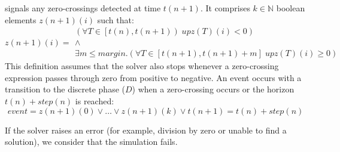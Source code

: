 \documentclass[11pt,titlepage,twoside]{report}
\newcommand{\bN}{\mathbb{N}}
\begin{document}
\begin{description}[leftmargin=3.5em,style=multiline]
    \item[$z(n+1)$] signals any zero-crossings detected at time $t(n+1)$.
      It comprises $k \in \bN$ boolean elements $z(n+1)(i)$ such that:
      \[
      z(n+1)(i) = %
        \begin{array}{l}
           (\forall T \in \left[t(n), t(n+1)\right) \; upz(T)(i) < 0) \\
           \wedge \\
           \exists m \leq \mathit{margin}.
              (\forall T \in [t(n+1), t(n+1)+m] \; upz(T)(i) \geq 0)
        \end{array}
      \]
This definition assumes that the solver also stops whenever a zero-crossing 
expression passes through zero from positive to negative.
An event occurs with a transition to the discrete phase ($D$) when a zero-crossing
occurs or the horizon $t(n)+step(n)$ is reached:
  \[\mathit{event} = z(n+1)(0) \vee \dots \vee z(n+1)(k) \vee
                             t(n+1) = t(n) + step(n)
  \]
\end{description}
If the solver raises an error (for example, division by zero or unable to 
find a
solution), we consider that the simulation fails.
\end{document}
